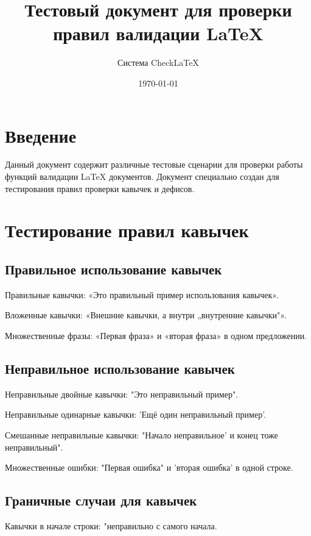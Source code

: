 \documentclass[12pt,a4paper]{article}
\title{Тестовый документ для проверки правил валидации LaTeX}
\author{Система CheckLaTeX}
\date{\today}
\begin{document}
\maketitle

\section{Введение}

Данный документ содержит различные тестовые сценарии для проверки работы функций валидации LaTeX документов. Документ специально создан для тестирования правил проверки кавычек и дефисов.

\section{Тестирование правил кавычек}

\subsection{Правильное использование кавычек}

Правильные кавычки: «Это правильный пример использования кавычек».

Вложенные кавычки: «Внешние кавычки, а внутри „внутренние кавычки"».

Множественные фразы: «Первая фраза» и «вторая фраза» в одном предложении.

\subsection{Неправильное использование кавычек}

Неправильные двойные кавычки: "Это неправильный пример".

Неправильные одинарные кавычки: 'Ещё один неправильный пример'.

Смешанные неправильные кавычки: "Начало неправильное' и конец тоже неправильный".

Множественные ошибки: "Первая ошибка" и 'вторая ошибка' в одной строке.

\subsection{Граничные случаи для кавычек}

Кавычки в начале строки: "неправильно с самого начала.
\end{document}
